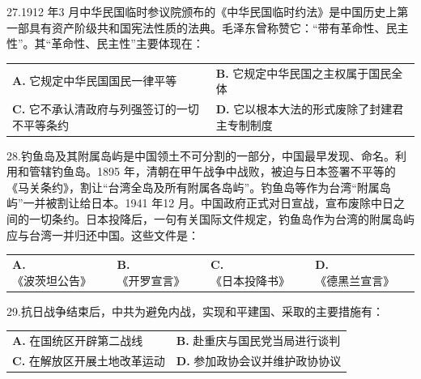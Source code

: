 \documentclass[UTF8,11pt]{ctexart}
\begin{document}
27.1912 年3 月中华民国临时参议院颁布的《中华民国临时约法》是中国历史上第一部具有资产阶级共和国宪法性质的法典。毛泽东曾称赞它：“带有革命性、民主性”。其“革命性、民主性”主要体现在：


\begin{center}\begin{tabular}{>{\raggedright\arraybackslash}p{\dimexpr(\linewidth-4\tabcolsep)/2\relax}>{\raggedright\arraybackslash}p{\dimexpr(\linewidth-4\tabcolsep)/2\relax}}
\textbf{A.} 它规定中华民国国民一律平等 & \textbf{B.} 它规定中华民国之主权属于国民全体\\[.35em]
\textbf{C.} 它不承认清政府与列强签订的一切不平等条约 & \textbf{D.} 它以根本大法的形式废除了封建君主专制制度\\[.35em]\end{tabular}\end{center}

28.钓鱼岛及其附属岛屿是中国领土不可分割的一部分，中国最早发现、命名。利用和管辖钓鱼岛。1895 年，清朝在甲午战争中战败，被迫与日本签署不平等的《马关条约》，割让“台湾全岛及所有附属各岛屿”。钓鱼岛等作为台湾“附属岛屿”一并被割让给日本。1941 年12 月。中国政府正式对日宣战，宣布废除中日之间的一切条约。日本投降后，一句有关国际文件规定，钓鱼岛作为台湾的附属岛屿应与台湾一并归还中国。这些文件是：


\begin{center}\begin{tabular}{>{\raggedright\arraybackslash}p{\dimexpr(\linewidth-8\tabcolsep)/4\relax}>{\raggedright\arraybackslash}p{\dimexpr(\linewidth-8\tabcolsep)/4\relax}>{\raggedright\arraybackslash}p{\dimexpr(\linewidth-8\tabcolsep)/4\relax}>{\raggedright\arraybackslash}p{\dimexpr(\linewidth-8\tabcolsep)/4\relax}}
\textbf{A.} 《波茨坦公告》 & \textbf{B.} 《开罗宣言》 & \textbf{C.} 《日本投降书》 & \textbf{D.} 《德黑兰宣言》\\[.35em]\end{tabular}\end{center}

29.抗日战争结束后，中共为避免内战，实现和平建国、采取的主要措施有：


\begin{center}\begin{tabular}{>{\raggedright\arraybackslash}p{\dimexpr(\linewidth-4\tabcolsep)/2\relax}>{\raggedright\arraybackslash}p{\dimexpr(\linewidth-4\tabcolsep)/2\relax}}
\textbf{A.} 在国统区开辟第二战线 & \textbf{B.} 赴重庆与国民党当局进行谈判\\[.35em]
\textbf{C.} 在解放区开展土地改革运动 & \textbf{D.} 参加政协会议并维护政协协议\\[.35em]\end{tabular}\end{center}
\end{document}
